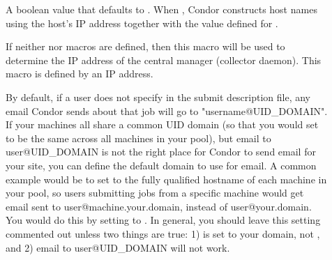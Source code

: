 \begin{description}
\item[] \label{param:NoDNS}
  A boolean value that defaults to .
  When , Condor constructs host names using the host's IP address
  together with the value defined for . 

\item[] \label{param:CMIPAddr}
  If neither  nor 
   macros are defined, then this
  macro will be used to determine the IP address of the central
  manager (collector daemon).
  This macro is defined by an IP address.

\item[] \label{param:EmailDomain}
  By default, if a user does not specify  in the
  submit description file, any email Condor sends about that job will
  go to "username@UID\_DOMAIN".
  If your machines all share a common UID domain (so that you would
  set  to be the same across all machines in your
  pool), but email to user@UID\_DOMAIN is not the right place for
  Condor to send email for your site, you can define the default
  domain to use for email.
  A common example would be to set  to the fully
  qualified hostname of each machine in your pool, so users submitting
  jobs from a specific machine would get email sent to
  user@machine.your.domain, instead of user@your.domain.  
  You would do this by setting  to
  . 
  In general, you should leave this setting commented out unless two
  things are true: 1)  is set to your domain, not
  , and 2) email to user@UID\_DOMAIN will not 
  work. 
  

\end{description}
